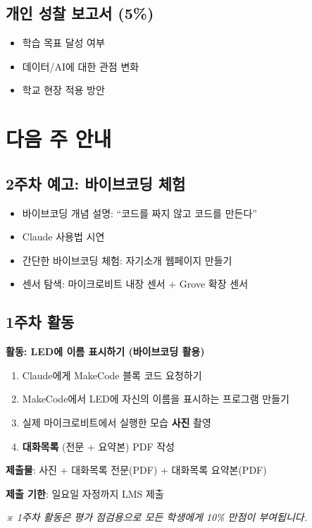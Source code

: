 \documentclass[11pt, a4paper]{article}
\begin{document}
\subsection{개인 성찰 보고서 (5\%)}

\begin{itemize}
    \item 학습 목표 달성 여부
    \item 데이터/AI에 대한 관점 변화
    \item 학교 현장 적용 방안
\end{itemize}

\section{다음 주 안내}

\subsection{2주차 예고: 바이브코딩 체험}

\begin{itemize}
    \item 바이브코딩 개념 설명: ``코드를 짜지 않고 코드를 만든다''
    \item Claude 사용법 시연
    \item 간단한 바이브코딩 체험: 자기소개 웹페이지 만들기
    \item 센서 탐색: 마이크로비트 내장 센서 + Grove 확장 센서
\end{itemize}

\subsection{1주차 활동}

\begin{activity}
\textbf{활동: LED에 이름 표시하기 (바이브코딩 활용)}

\begin{enumerate}
    \item Claude에게 MakeCode 블록 코드 요청하기
    \item MakeCode에서 LED에 자신의 이름을 표시하는 프로그램 만들기
    \item 실제 마이크로비트에서 실행한 모습 \textbf{사진} 촬영
    \item \textbf{대화목록} (전문 + 요약본) PDF 작성
\end{enumerate}

\textbf{제출물}: 사진 + 대화목록 전문(PDF) + 대화목록 요약본(PDF)

\textbf{제출 기한}: 일요일 자정까지 LMS 제출

\vspace{0.5em}
\textit{※ 1주차 활동은 평가 점검용으로 모든 학생에게 10\% 만점이 부여됩니다.}
\end{activity}
\end{document}
